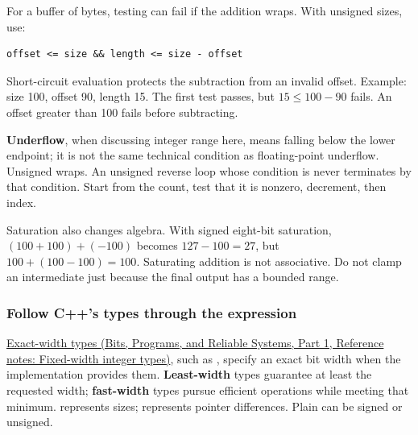 For a buffer of  bytes, testing  can fail if the addition wraps. With unsigned sizes, use:

\begin{verbatim}
offset <= size && length <= size - offset
\end{verbatim}

Short-circuit evaluation protects the subtraction from an invalid offset. Example: size 100, offset 90, length 15. The first test passes, but \(15\le 100-90\) fails. An offset greater than 100 fails before subtracting.

\textbf{Underflow}, when discussing integer range here, means falling below the lower endpoint; it is not the same technical condition as floating-point underflow. Unsigned  wraps. An unsigned reverse loop whose condition is  never terminates by that condition. Start from the count, test that it is nonzero, decrement, then index.

Saturation also changes algebra. With signed eight-bit saturation, \((100+100)+(-100)\) becomes \(127-100=27\), but \(100+(100-100)=100\). Saturating addition is not associative. Do not clamp an intermediate just because the final output has a bounded range.

\subsubsection{Follow C++'s types through the expression}\label{05-engine-i-ch001-follow-cs-types-through-the-expression}

\hypertarget{05-engine-i-ch001-follow-cs-types-through-the-expression}{}

\href{../01-Bits-Programs-and-Reliable-Systems-P01/main.pdf\#nameddest=appendix-cc04044b5782}{Exact-width types (Bits, Programs, and Reliable Systems, Part 1, Reference notes: Fixed-width integer types)}, such as , specify an exact bit width when the implementation provides them. \textbf{Least-width} types guarantee at least the requested width; \textbf{fast-width} types pursue efficient operations while meeting that minimum.  represents sizes;  represents pointer differences. Plain  can be signed or unsigned.

